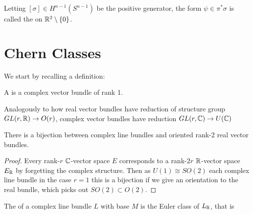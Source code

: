 \documentclass{article}
\begin{document}
\begin{definition}
Letting $[\sigma]\in H^{n-1}(S^{n-1})$ be the positive generator, the form $\psi \in \pi^\ast \sigma$ is called the  on $\mathbb{R}^2 \setminus \left\{ 0 \right\}$.
\end{definition}

\section{Chern Classes}

We start by recalling a definition:

\begin{definition}
	A  is a complex vector bundle of rank 1.
\end{definition}

\begin{remark}
	Analogously to how real vector bundles have reduction of structure group $GL(r,\mathbb{R}) \to O(r)$, complex vector bundles have reduction $GL(r,\mathbb{C})\to U(\mathbb{C})$
\end{remark}

\begin{lemma}
	There is a bijection between complex line bundles  and oriented rank-2 real vector bundles.
\end{lemma}
\begin{proof}
	Every rank-$r$ $\mathbb{C}$-vector space $E$ corresponds to a rank-$2r$ $\mathbb{R}$-vector space $E_{\mathbb{R}}$  by forgetting the complex structure. Then as $U(1) \cong SO(2)$ each complex line bundle in the case $r=1$ this is a bijection if we give an orientation to the real bundle, which picks out $SO(2) \subset O(2)$.
\end{proof}

\begin{definition}
	The  of a complex line bundle $L$ with base $M$ is the Euler class of $L_{\mathbb{R}}$, that is 
\end{definition}
\end{document}
